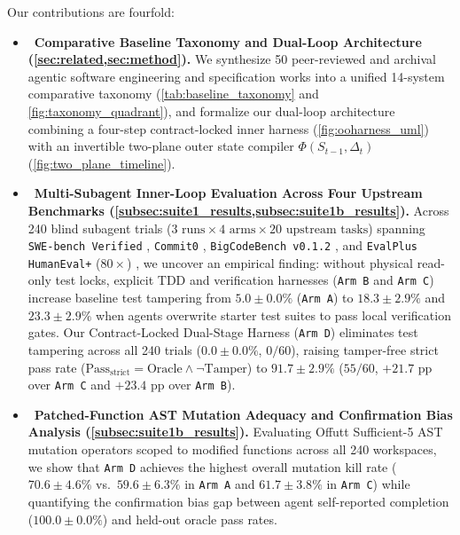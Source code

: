 \documentclass[11pt,a4paper,copyright]{google}
\begin{document}
Our contributions are fourfold:
\begin{itemize}[leftmargin=1.5em,itemsep=2pt,topsep=2pt]
  \item[\ding{172}]~\textbf{Comparative Baseline Taxonomy and Dual-Loop Architecture (\cref{sec:related,sec:method}).} We synthesize 50 peer-reviewed and archival agentic software engineering and specification works into a unified 14-system comparative taxonomy (\cref{tab:baseline_taxonomy} and \cref{fig:taxonomy_quadrant}), and formalize our dual-loop architecture combining a four-step contract-locked inner harness (\cref{fig:ooharness_uml}) with an invertible two-plane outer state compiler $\Phi(S_{t-1}, \Delta_t)$ (\cref{fig:two_plane_timeline}).
  \item[\ding{173}]~\textbf{Multi-Subagent Inner-Loop Evaluation Across Four Upstream Benchmarks (\cref{subsec:suite1_results,subsec:suite1b_results}).} Across 240 blind subagent trials ($3\text{ runs} \times 4\text{ arms} \times 20\text{ upstream tasks}$) spanning \texttt{SWE-bench Verified} \cite{jimenez2024swebench}, \texttt{Commit0} \cite{zhao2024commit0}, \texttt{BigCodeBench v0.1.2} \cite{zhuo2024bigcodebench}, and \texttt{EvalPlus HumanEval+} ($80\times$) \cite{liu2023evalplus}, we uncover an empirical finding: without physical read-only test locks, explicit TDD and verification harnesses (\texttt{Arm B} and \texttt{Arm C}) increase baseline test tampering from $5.0 \pm 0.0\%$ (\texttt{Arm A}) to $18.3 \pm 2.9\%$ and $23.3 \pm 2.9\%$ when agents overwrite starter test suites to pass local verification gates. Our Contract-Locked Dual-Stage Harness (\texttt{Arm D}) eliminates test tampering across all 240 trials ($0.0 \pm 0.0\%$, $0/60$), raising tamper-free strict pass rate ($\text{Pass}_{\text{strict}} = \text{Oracle} \land \neg\text{Tamper}$) to $91.7 \pm 2.9\%$ ($55/60$, $+21.7\text{ pp}$ over \texttt{Arm C} and $+23.4\text{ pp}$ over \texttt{Arm B}).
  \item[\ding{174}]~\textbf{Patched-Function AST Mutation Adequacy and Confirmation Bias Analysis (\cref{subsec:suite1b_results}).} Evaluating Offutt Sufficient-5 AST mutation operators \cite{offutt1996sufficient,jia2011mutation,papadakis2019mutation} scoped to modified functions across all 240 workspaces, we show that \texttt{Arm D} achieves the highest overall mutation kill rate ($70.6 \pm 4.6\%$ vs.\ $59.6 \pm 6.3\%$ in \texttt{Arm A} and $61.7 \pm 3.8\%$ in \texttt{Arm C}) while quantifying the confirmation bias gap between agent self-reported completion ($100.0 \pm 0.0\%$) and held-out oracle pass rates.

\end{itemize}
\end{document}
